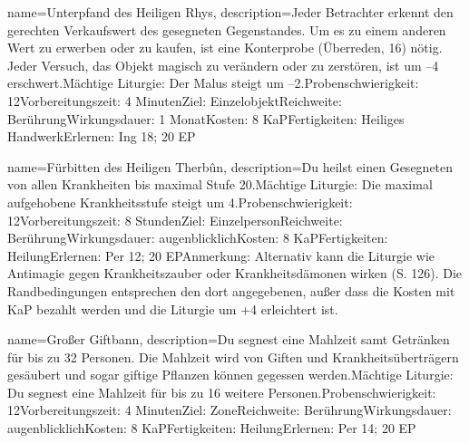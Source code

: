 {
    name={Unterpfand des Heiligen Rhys},
    description={Jeder Betrachter erkennt den gerechten Verkaufswert des gesegneten Gegenstandes. Um es zu einem anderen Wert zu erwerben oder zu kaufen, ist eine Konterprobe (Überreden, 16) nötig. Jeder Versuch, das Objekt magisch zu verändern oder zu zerstören, ist um –4 erschwert.\newline Mächtige Liturgie: Der Malus steigt um –2.\newline Probenschwierigkeit: 12\newline Vorbereitungszeit: 4 Minuten\newline Ziel: Einzelobjekt\newline Reichweite: Berührung\newline Wirkungsdauer: 1 Monat\newline Kosten: 8 KaP\newline Fertigkeiten: Heiliges Handwerk\newline Erlernen: Ing 18; 20 EP}
}


{
    name={Fürbitten des Heiligen Therbûn},
    description={Du heilst einen Gesegneten von allen Krankheiten bis maximal Stufe 20.\newline Mächtige Liturgie: Die maximal aufgehobene Krankheitsstufe steigt um 4.\newline Probenschwierigkeit: 12\newline Vorbereitungszeit: 8 Stunden\newline Ziel: Einzelperson\newline Reichweite: Berührung\newline Wirkungsdauer: augenblicklich\newline Kosten: 8 KaP\newline Fertigkeiten: Heilung\newline Erlernen: Per 12; 20 EP\newline Anmerkung: Alternativ kann die Liturgie wie Antimagie gegen Krankheitszauber oder Krankheitsdämonen wirken (S. 126). Die Randbedingungen entsprechen den dort angegebenen, außer dass die Kosten mit KaP bezahlt werden und die Liturgie um +4 erleichtert ist.}
}


{
    name={Großer Giftbann},
    description={Du segnest eine Mahlzeit samt Getränken für bis zu 32 Personen. Die Mahlzeit wird von Giften und Krankheitsüberträgern gesäubert und sogar giftige Pflanzen können gegessen werden.\newline Mächtige Liturgie: Du segnest eine Mahlzeit für bis zu 16 weitere Personen.\newline Probenschwierigkeit: 12\newline Vorbereitungszeit: 4 Minuten\newline Ziel: Zone\newline Reichweite: Berührung\newline Wirkungsdauer: augenblicklich\newline Kosten: 8 KaP\newline Fertigkeiten: Heilung\newline Erlernen: Per 14; 20 EP}
}



